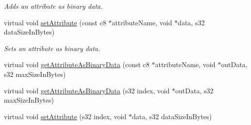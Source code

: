 \begin{DoxyCompactItemize}
\begin{DoxyCompactList}\small\item\em Adds an attribute as binary data. \end{DoxyCompactList}\item 
\hypertarget{classirr_1_1io_1_1_c_attributes_ad58521310dc52a31054aacb25136f045}{virtual void \hyperlink{classirr_1_1io_1_1_c_attributes_ad58521310dc52a31054aacb25136f045}{set\-Attribute} (const c8 $\ast$attribute\-Name, void $\ast$data, s32 data\-Size\-In\-Bytes)}\label{classirr_1_1io_1_1_c_attributes_ad58521310dc52a31054aacb25136f045}

\begin{DoxyCompactList}\small\item\em Sets an attribute as binary data. \end{DoxyCompactList}\item 
virtual void \hyperlink{classirr_1_1io_1_1_c_attributes_abed02ddc71c32114c8e37bbbf827ea9d}{get\-Attribute\-As\-Binary\-Data} (const c8 $\ast$attribute\-Name, void $\ast$out\-Data, s32 max\-Size\-In\-Bytes)
\item 
virtual void \hyperlink{classirr_1_1io_1_1_c_attributes_aa8dec860c2b5a783f933182eca0cb509}{get\-Attribute\-As\-Binary\-Data} (s32 index, void $\ast$out\-Data, s32 max\-Size\-In\-Bytes)
\item 
\hypertarget{classirr_1_1io_1_1_c_attributes_a7acaabdaffa7f26edbf98bdcbeba577d}{virtual void \hyperlink{classirr_1_1io_1_1_c_attributes_a7acaabdaffa7f26edbf98bdcbeba577d}{set\-Attribute} (s32 index, void $\ast$data, s32 data\-Size\-In\-Bytes)}\label{classirr_1_1io_1_1_c_attributes_a7acaabdaffa7f26edbf98bdcbeba577d}


\end{DoxyCompactItemize}
